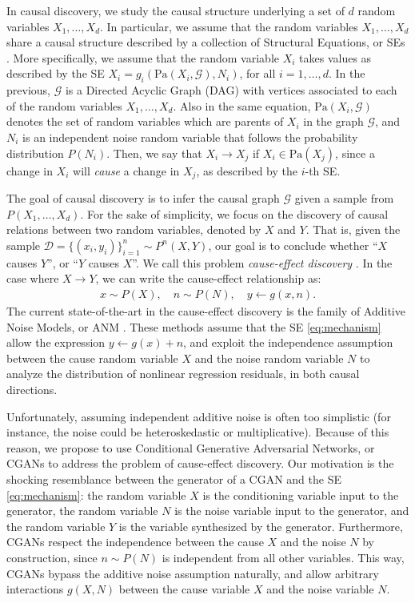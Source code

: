 \documentclass[a4paper]{article}
\begin{document}
  In causal discovery, we study the causal structure underlying a set of $d$
  random variables $X_1, \ldots, X_d$. In particular, we assume that the random
  variables $X_1, \ldots, X_d$ share a causal structure described by a
  collection of Structural Equations, or SEs
  \citep{pearl2009causality}.  More specifically, we assume that the random
  variable $X_i$ takes values as described by the SE
  $X_i = g_i(\text{Pa}(X_i, \mathcal{G}), N_i)$,
  for all $i=1,\ldots,d$. In the previous, $\mathcal{G}$ is a Directed Acyclic
  Graph (DAG) with vertices associated to each of the random variables $X_1,
  \ldots, X_d$.  Also in the same equation, $\text{Pa}(X_i, \mathcal{G})$
  denotes the set of random variables which are parents of $X_i$ in the graph
  $\mathcal{G}$, and $N_i$ is an independent noise random variable that
  follows the probability distribution $P(N_i)$. Then, we say that $X_i \to X_j$
  if $X_i \in \text{Pa}(X_j)$, since a change in $X_i$ will \emph{cause} a change in $X_j$,
  as described by the $i$-th SE.

  The goal of causal discovery is to infer the causal graph $\mathcal{G}$ given
  a sample from $P(X_1, \ldots, X_d)$. For
  the sake of simplicity, we focus on the discovery of causal relations
  between two random variables, denoted by $X$ and $Y$. That is, given the sample
  $\mathcal{D} = \{(x_i,y_i)\}_{i=1}^n \sim P^n(X,Y)$, our goal is to
  conclude whether ``$X$ causes $Y$'', or ``$Y$
  causes $X$''. We call this problem \emph{cause-effect discovery}
  \citep{mooij2014distinguishing}. In the case where $X \to Y$, we can write
  the cause-effect relationship as:
  \begin{align}
    x \sim P(X),\quad
    n \sim P(N),\quad
    y \leftarrow g(x,n).\label{eq:mechanism}
  \end{align}
  The current state-of-the-art in the cause-effect discovery is the family of
  Additive Noise Models, or ANM \citep{mooij2014distinguishing}. These methods
  assume that the SE \eqref{eq:mechanism} allow the
  expression $y \leftarrow g(x)+n$, and exploit the independence assumption
  between the cause random variable $X$ and the noise random variable $N$ to
  analyze the distribution of nonlinear regression residuals, in both
  causal directions.

  Unfortunately, assuming independent additive noise is often too simplistic
  (for instance, the noise could be heteroskedastic or multiplicative).
  Because of this reason, we propose to use Conditional Generative Adversarial
  Networks, or CGANs \citep{conditionalGans} to address the problem of
  cause-effect discovery. Our motivation is the shocking resemblance between
  the generator
  of a CGAN and the
  SE \eqref{eq:mechanism}: the random variable $X$ is the
  conditioning variable
  input to the generator, the random variable $N$ is the noise variable input
  to the generator, and the random variable $Y$ is the variable synthesized by
  the generator. Furthermore, CGANs respect the independence between the cause
  $X$ and the noise $N$ by construction, since $n \sim P(N)$ is independent
  from all other variables.  This way, CGANs bypass the additive noise
  assumption naturally, and allow arbitrary interactions $g(X,N)$
  between the cause variable $X$ and the noise variable $N$.
\end{document}
